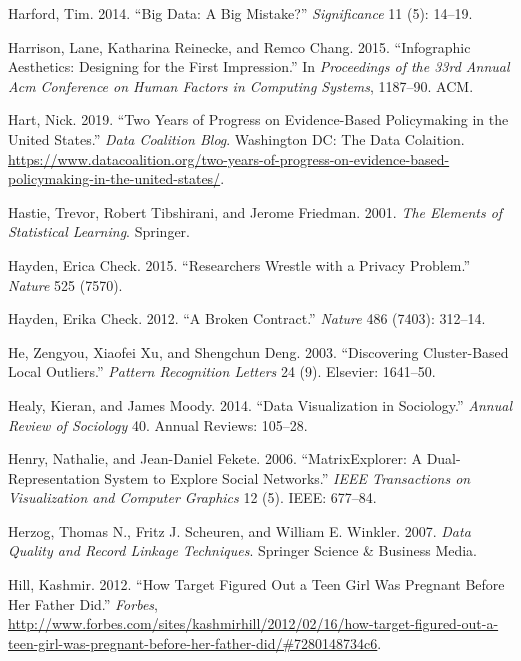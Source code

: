 \documentclass[]{krantz}
\begin{document}
\hypertarget{ref-harford2014big}{}
Harford, Tim. 2014. ``Big Data: A Big Mistake?'' \emph{Significance} 11
(5): 14--19.

\hypertarget{ref-harrison2015infographic}{}
Harrison, Lane, Katharina Reinecke, and Remco Chang. 2015. ``Infographic
Aesthetics: Designing for the First Impression.'' In \emph{Proceedings
of the 33rd Annual Acm Conference on Human Factors in Computing
Systems}, 1187--90. ACM.

\hypertarget{ref-Hart}{}
Hart, Nick. 2019. ``Two Years of Progress on Evidence-Based Policymaking
in the United States.'' \emph{Data Coalition Blog}. Washington DC: The
Data Colaition.
\url{https://www.datacoalition.org/two-years-of-progress-on-evidence-based-policymaking-in-the-united-states/}.

\hypertarget{ref-HastieTibshirani}{}
Hastie, Trevor, Robert Tibshirani, and Jerome Friedman. 2001. \emph{The
Elements of Statistical Learning}. Springer.

\hypertarget{ref-check2015researchers}{}
Hayden, Erica Check. 2015. ``Researchers Wrestle with a Privacy
Problem.'' \emph{Nature} 525 (7570).

\hypertarget{ref-hayden2012broken}{}
Hayden, Erika Check. 2012. ``A Broken Contract.'' \emph{Nature} 486
(7403): 312--14.

\hypertarget{ref-he2003discovering}{}
He, Zengyou, Xiaofei Xu, and Shengchun Deng. 2003. ``Discovering
Cluster-Based Local Outliers.'' \emph{Pattern Recognition Letters} 24
(9). Elsevier: 1641--50.

\hypertarget{ref-healy2014data}{}
Healy, Kieran, and James Moody. 2014. ``Data Visualization in
Sociology.'' \emph{Annual Review of Sociology} 40. Annual Reviews:
105--28.

\hypertarget{ref-henry2006matrixexplorer}{}
Henry, Nathalie, and Jean-Daniel Fekete. 2006. ``MatrixExplorer: A
Dual-Representation System to Explore Social Networks.'' \emph{IEEE
Transactions on Visualization and Computer Graphics} 12 (5). IEEE:
677--84.

\hypertarget{ref-herzog2007data}{}
Herzog, Thomas N., Fritz J. Scheuren, and William E. Winkler. 2007.
\emph{Data Quality and Record Linkage Techniques}. Springer Science \&
Business Media.

\hypertarget{ref-hill2012target}{}
Hill, Kashmir. 2012. ``How Target Figured Out a Teen Girl Was Pregnant
Before Her Father Did.'' \emph{Forbes},
\url{http://www.forbes.com/sites/kashmirhill/2012/02/16/how-target-figured-out-a-teen-girl-was-pregnant-before-her-father-did/\#7280148734c6}.
\end{document}
